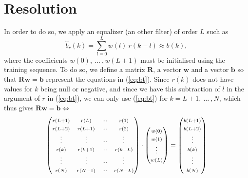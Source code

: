 \documentclass[twocolumn, 12pt]{IEEEtran}
\begin{document}
 \section{Resolution}
 
 In order to do so, we apply an equalizer (an other filter) of order $L$ such as 
 \begin{equation}\label{eq:bt}
 { \hat{b}_{r}(k) = \sum\limits_{l=0}^{L}w(l)~r(k-l) \approx b(k) },
 \end{equation}
 where the coefficients ${w(0)},~{\dots~},{w(L+1)}$ must be initialised using the training sequence. To do so, we define a matrix $\bm{R}$, a vector $\bm{w}$ and a vector $\bm{b}$ so that $\bm{Rw}=\bm{b}$ represent the equations in (\ref{eq:bt}). Since $r(k)$ does not have values for $k$ being null or negative, and since we have this subtraction of $l$ in the argument of $r$ in (\ref{eq:bt}), we can only use (\ref{eq:bt}) for $k = L+1,~\dots~, N$, which thus gives $\bm{Rw}=\bm{b} \Leftrightarrow $
\begin{equation}\label{eq:matrixes}
\begin{pmatrix}
    \mathsmaller{r(L+1)}   & \mathsmaller{r(L)} & \mathsmaller{\cdots}  & \mathsmaller{r(1)} \\
    \mathsmaller{r(L+2)}   & \mathsmaller{r(L+1)} & \mathsmaller{\cdots}  & \mathsmaller{r(2)} \\
    \mathsmaller{\vdots}   & \mathsmaller{\vdots} & \mathsmaller{\cdots} & \mathsmaller{\vdots} \\
    \mathsmaller{r(k)}     & \mathsmaller{r(k+1)} & \mathsmaller{\cdots} & \mathsmaller{r(k-L)} \\
    \mathsmaller{\vdots}   & \mathsmaller{\vdots} & \mathsmaller{\cdots} & \mathsmaller{\vdots} \\
    \mathsmaller{r(N)} & \mathsmaller{r(N-1)} & \mathsmaller{\cdots}  & \mathsmaller{r(N-L)}
\end{pmatrix}
\cdot
\begin{pmatrix}
   \mathsmaller{w(0)}\\
   \mathsmaller{w(1)}\\
   \mathsmaller{\vdots}\\
   \mathsmaller{w(L)}
\end{pmatrix}
=
\begin{pmatrix}
   \mathsmaller{b(L+1)}\\
   \mathsmaller{b(L+2)}\\
   \mathsmaller{\vdots}\\
   \mathsmaller{b(k)}\\
   \mathsmaller{\vdots}\\
   \mathsmaller{b(N)}
\end{pmatrix}
\end{equation}
\end{document}
